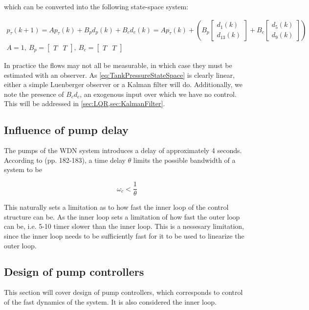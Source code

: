 which can be converted into the following state-space system:

\begin{equation}\label{eq:TankPressureStateSpace}
	\begin{gathered}
				p_\tau(k+1) = A p_\tau(k) + B_pd_p(k) + B_cd_c(k)
				= A p_\tau(k) + \left(B_p \begin{bmatrix}d_1(k) \\ d_{13}(k)\end{bmatrix} 
				+ B_c\begin{bmatrix}d_5(k) \\ d_9(k)\end{bmatrix}\right) \\      
				A = 1, \ B_p = \begin{bmatrix}T & T \end{bmatrix}, \ B_c = \begin{bmatrix}T & T\end{bmatrix}
	\end{gathered}
\end{equation}

In practice the flows may not all be measurable, in which case they must be estimated with an observer. As \cref{eq:TankPressureStateSpace} is clearly linear, either a simple Luenberger observer or a Kalman filter will do. Additionally, we note the presence of $B_cd_c$, an exogenous input over which we have no control. This will be addressed in \cref{sec:LQR,sec:KalmanFilter}.

\subsection{Influence of pump delay}
The pumps of the WDN system introduces a delay of approximately 4 seconds. According to \cite{Skogestad2005} (pp. 182-183), 
a time delay $\theta$ limits the possible bandwidth of a system to be 

\begin{equation}\label{eq:BWdelay}
	\omega_c < \frac{1}{\theta}
\end{equation}

This naturally sets a limitation as to how fast the inner loop of the control structure can be. As the inner loop sets a limitation of how fast the outer loop can be, i.e. 5-10 timer slower than the inner loop. This is a nessesary limitation, since the inner loop needs to be sufficiently fast for it to be used to linearize the outer loop. 

\subsection{Design of pump controllers}
This section will cover design of pump controllers, which corresponds to control of the fast dynamics of the system. It is also considered the inner loop. 
